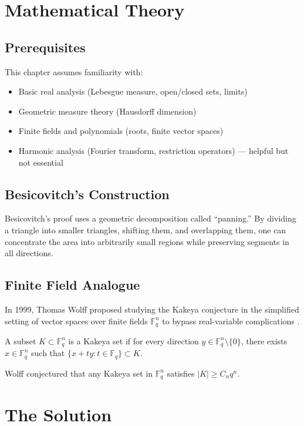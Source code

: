 \section{Mathematical Theory}

\subsection{Prerequisites}
This chapter assumes familiarity with:
\begin{itemize}
\item Basic real analysis (Lebesgue measure, open/closed sets, limits)
\item Geometric measure theory (Hausdorff dimension)
\item Finite fields and polynomials (roots, finite vector spaces)
\item Harmonic analysis (Fourier transform, restriction operators) --- helpful but not essential
\end{itemize}

\subsection{Besicovitch's Construction}
Besicovitch's proof uses a geometric decomposition called ``panning.'' By dividing a triangle into smaller triangles, shifting them, and overlapping them, one can concentrate the area into arbitrarily small regions while preserving segments in all directions.

\subsection{Finite Field Analogue}
In 1999, Thomas Wolff proposed studying the Kakeya conjecture in the simplified setting of vector spaces over finite fields $\mathbb{F}_q^n$ to bypass real-variable complications \cite{wolff1999}.

\begin{definition}
A subset $K \subset \mathbb{F}_q^n$ is a Kakeya set if for every direction $y \in \mathbb{F}_q^n \setminus \{0\}$, there exists $x \in \mathbb{F}_q^n$ such that $\{x + t y : t \in \mathbb{F}_q\} \subset K$.
\end{definition}

Wolff conjectured that any Kakeya set in $\mathbb{F}_q^n$ satisfies $|K| \geq C_n q^n$.

\section{The Solution}

